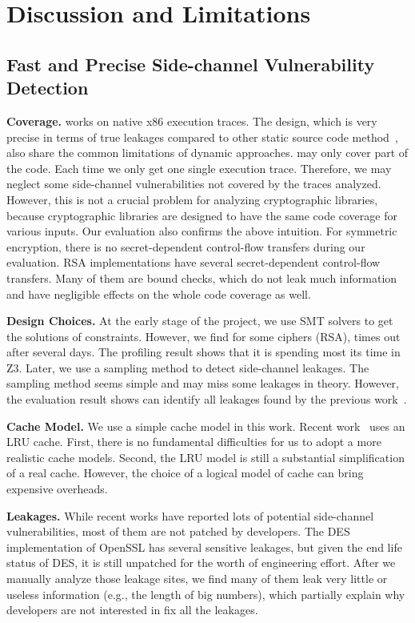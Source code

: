 \chapter{Discussion and Limitations}
\section{Fast and Precise Side-channel Vulnerability Detection}
\textbf{Coverage.} \detect{} works on native x86 execution traces. The design, which is very precise in terms of true leakages compared to other static source code method~\cite{197207,BacelarAlmeida:2013:FVS:2483313.2483334}, also share the common limitations of dynamic approaches. \detect{} may only cover part of the code. Each time we only get one single execution trace. Therefore, we may neglect some side-channel vulnerabilities not covered by the traces analyzed. However, this is not a crucial problem for analyzing cryptographic libraries, because cryptographic libraries are designed to have the same code coverage for various inputs. Our evaluation also confirms the above intuition. For symmetric encryption, there is no secret-dependent control-flow transfers during our evaluation. RSA implementations have several secret-dependent control-flow transfers. Many of them are bound checks, which do not leak much information and have negligible effects on the whole code coverage as well.

\textbf{Design Choices.} At the early stage of the project, we use SMT solvers to get the solutions of constraints. However, we find for some ciphers (RSA), \detect{} times out after several days. The profiling result shows that it is spending most its time in Z3. Later, we use a sampling method to detect side-channel leakages. The sampling method seems simple and may miss some leakages in theory. However, the evaluation result shows \detect{} can identify all leakages found by the previous work~\cite{203878,236338,Brotzman19Casym}.  

\textbf{Cache Model.} We use a simple cache model in this work. Recent work~\cite{Brotzman19Casym,182946} uses an LRU cache. First, there is no fundamental difficulties for us to adopt a more realistic cache models. Second, the LRU model is still a substantial simplification of a real cache. However, the choice of a logical model of cache can bring expensive overheads.

\textbf{Leakages.} While recent works have reported lots of potential side-channel vulnerabilities, most of them are not patched by developers. The DES implementation of OpenSSL has several sensitive leakages, but given the end life status of DES, it is still unpatched for the worth of engineering effort. After we manually analyze those leakage sites, we find many of them leak very little or useless information (e.g., the length of big numbers), which partially explain why developers are not interested in fix all the leakages. 
